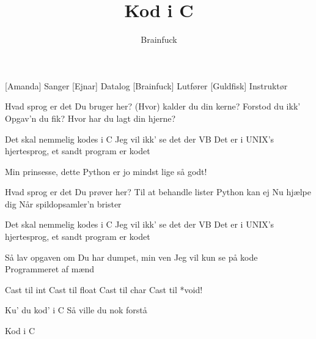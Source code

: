 \documentclass[a4paper,11pt]{article}
\title{Kod i C}
\author{Brainfuck}
\begin{document}
\maketitle

\begin{roles}
  [Amanda] Sanger
  [Ejnar] Datalog
  [Brainfuck] Lutfører
  [Guldfisk] Instruktør
\end{roles}

\begin{song}



  

   Hvad sprog er det
  Du bruger her?
  (Hvor) kalder du din kerne?
  Forstod du ikk'
  Opgav'n du fik?
  Hvor har du lagt din hjerne?

   Det skal nemmelig kodes i C
  Jeg vil ikk' se det der VB
  Det er i UNIX's hjertesprog, et sandt program er kodet

   Min prinsesse, dette Python er jo mindst lige så godt!

   Hvad sprog er det
  Du prøver her?
  Til at behandle lister
  Python kan ej
  Nu hjælpe dig
  Når spildopsamler'n brister

   Det skal nemmelig kodes i C
  Jeg vil ikk' se det der VB
  Det er i UNIX's hjertesprog, et sandt program er kodet

  

   Så lav opgaven om
  Du har dumpet, min ven
  Jeg vil kun se på kode
  Programmeret af mænd

   Cast til int
  Cast til float
  Cast til char
  Cast til *void!

   Ku' du kod' i C
  Så ville du nok forstå

   Kod i C


\end{song}
\end{document}
